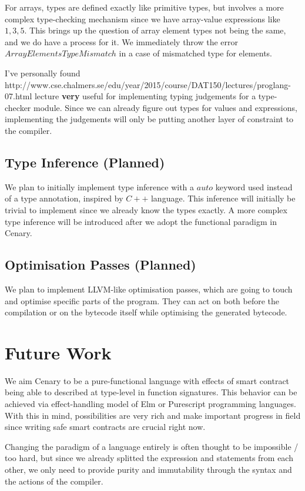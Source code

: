 \documentclass{article}
\begin{document}
For arrays, types are defined exactly like primitive types, but involves a more complex type-checking mechanism since we have array-value expressions like ${ 1, 3, 5}$. This brings up the question of array element types not being the same, and we do have a process for it. We immediately throw the error $ArrayElementsTypeMismatch$ in a case of mismatched type for elements.

I've personally found http://www.cse.chalmers.se/edu/year/2015/course/DAT150/lectures/proglang-07.html lecture \textbf{very} useful for implementing typing judgements for a type-checker module. Since we can already figure out types for values and expressions, implementing the judgements will only be putting another layer of constraint to the compiler.

\subsection{Type Inference (Planned)}
\label{subsec:type_inference}
We plan to initially implement type inference with a $auto$ keyword used instead of a type annotation, inspired by $C++$ language. This inference will initially be trivial to implement since we already know the types exactly. A more complex type inference will be introduced after we adopt the functional paradigm in Cenary.

\subsection{Optimisation Passes (Planned)}
\label{subsec:optimisation_passes}
We plan to implement LLVM-like optimisation passes, which are going to touch and optimise specific parts of the program. They can act on both before the compilation or on the bytecode itself while optimising the generated bytecode.
\section{Future Work}
We aim Cenary to be a pure-functional language with effects of smart contract being able to described at type-level in function signatures. This behavior can be achieved via effect-handling model of Elm or Purescript programming languages. With this in mind, possibilities are very rich and make important progress in field since writing safe smart contracts are crucial right now.

Changing the paradigm of a language entirely is often thought to be impossible / too hard, but since we already splitted the expression and statements from each other, we only need to provide purity and immutability through the syntax and the actions of the compiler.
\end{document}
